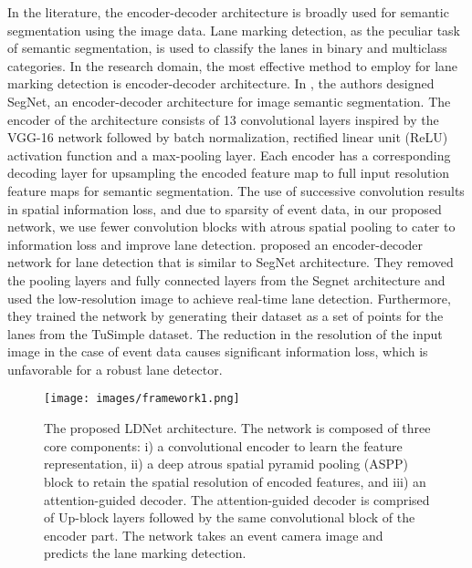 \documentclass[journal]{IEEEtran}
\begin{document}
\par 
In the literature, the encoder-decoder architecture is broadly used for semantic segmentation using the image data. Lane marking detection, as the peculiar task of semantic segmentation, is used to classify the lanes in binary and multiclass categories. In the research domain, the most effective method to employ for lane marking detection is encoder-decoder architecture. In \cite{badrinarayanan2017segnet}, the authors designed  SegNet, an encoder-decoder architecture for image semantic segmentation. The encoder of the architecture consists of 13 convolutional layers inspired by the VGG-16 network followed by batch normalization, rectified linear unit (ReLU) activation function and a max-pooling layer. Each encoder has a corresponding decoding layer for upsampling the encoded feature map to full input resolution feature maps for semantic segmentation. The use of successive convolution results in spatial information loss, and due to sparsity of event data, in our proposed network, we use fewer convolution blocks with atrous spatial pooling to cater to information loss and improve lane detection.
    \cite{chougule2018efficient} proposed an encoder-decoder network for lane detection that is similar to SegNet \cite{badrinarayanan2017segnet} architecture. They removed the pooling layers and fully connected layers from the Segnet architecture and used the low-resolution image to achieve real-time lane detection. Furthermore, they trained the network by generating their dataset as a set of points for the lanes from the TuSimple dataset. The reduction in the resolution of the input image in the case of event data causes significant information loss, which is unfavorable for a robust lane detector.
\begin{figure*}[t]
      \centering
      \texttt{[image: images/framework1.png]}
\caption{The proposed LDNet architecture. The network is composed of three core components: i) a convolutional encoder to learn the feature representation, ii) a deep atrous spatial pyramid pooling (ASPP) block to retain the spatial resolution of encoded features, and iii) an attention-guided decoder. The attention-guided decoder is comprised of Up-block layers followed by the same convolutional block of the encoder part. The network takes an event camera image and predicts the lane marking detection.}
      \label{architecture}
\end{figure*}
\par
\end{document}
